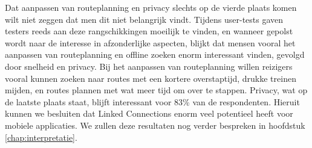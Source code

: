 Dat aanpassen van routeplanning en privacy slechts op de vierde plaats komen wilt niet zeggen dat men dit niet belangrijk vindt. Tijdens user-tests gaven testers reeds aan deze rangschikkingen moeilijk te vinden, en wanneer gepolst wordt naar de interesse in afzonderlijke aspecten, blijkt dat mensen vooral het aanpassen van routeplanning en offline zoeken enorm interessant vinden, gevolgd door snelheid en privacy. Bij het aanpassen van routeplanning willen reizigers vooral kunnen zoeken naar routes met een kortere overstaptijd, drukke treinen mijden, en routes plannen met wat meer tijd om over te stappen. Privacy, wat op de laatste plaats staat, blijft interessant voor 83\% van de respondenten. Hieruit kunnen we besluiten dat Linked Connections enorm veel potentieel heeft voor mobiele applicaties. We zullen deze resultaten nog verder bespreken in hoofdstuk \ref{chap:interpretatie}.

